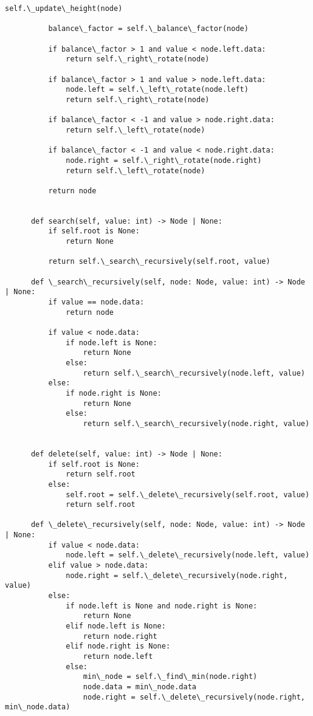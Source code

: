 \begin{lstlisting}[caption=二分ヒープの実装, label=binaryheap, frame=TRBL, label={binaryheap}]
          self.\_update\_height(node)
          
          balance\_factor = self.\_balance\_factor(node)
          
          if balance\_factor > 1 and value < node.left.data:
              return self.\_right\_rotate(node)
          
          if balance\_factor > 1 and value > node.left.data:
              node.left = self.\_left\_rotate(node.left)
              return self.\_right\_rotate(node)
          
          if balance\_factor < -1 and value > node.right.data:
              return self.\_left\_rotate(node)
          
          if balance\_factor < -1 and value < node.right.data:
              node.right = self.\_right\_rotate(node.right)
              return self.\_left\_rotate(node)
          
          return node
          
      
      def search(self, value: int) -> Node | None:
          if self.root is None:
              return None
          
          return self.\_search\_recursively(self.root, value)
  
      def \_search\_recursively(self, node: Node, value: int) -> Node | None:
          if value == node.data:
              return node
          
          if value < node.data:
              if node.left is None:
                  return None
              else:
                  return self.\_search\_recursively(node.left, value)
          else:
              if node.right is None:
                  return None
              else:
                  return self.\_search\_recursively(node.right, value)
              
      
      def delete(self, value: int) -> Node | None:
          if self.root is None:
              return self.root
          else:
              self.root = self.\_delete\_recursively(self.root, value)
              return self.root
      
      def \_delete\_recursively(self, node: Node, value: int) -> Node | None:
          if value < node.data:
              node.left = self.\_delete\_recursively(node.left, value)
          elif value > node.data:
              node.right = self.\_delete\_recursively(node.right, value)
          else:
              if node.left is None and node.right is None:
                  return None
              elif node.left is None:
                  return node.right
              elif node.right is None:
                  return node.left
              else:
                  min\_node = self.\_find\_min(node.right)
                  node.data = min\_node.data
                  node.right = self.\_delete\_recursively(node.right, min\_node.data)
          

\end{lstlisting}
